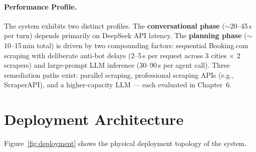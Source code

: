 \documentclass[12pt,a4paper]{report}
\begin{document}
\paragraph{Performance Profile.}
The system exhibits two distinct profiles. The \textbf{conversational phase} ($\sim$20--45\,s per
turn) depends primarily on DeepSeek API latency. The \textbf{planning phase} ($\sim$10--15\,min
total) is driven by two compounding factors: sequential Booking.com scraping with deliberate
anti-bot delays (2--5\,s per request across 3 cities $\times$ 2 scrapers) and large-prompt LLM
inference (30--90\,s per agent call). Three remediation paths exist: parallel scraping, professional
scraping APIs (e.g., ScraperAPI), and a higher-capacity LLM — each evaluated in Chapter~6.

\section{Deployment Architecture}

Figure~\ref{fig:deployment} shows the physical deployment topology of the system.
\end{document}

